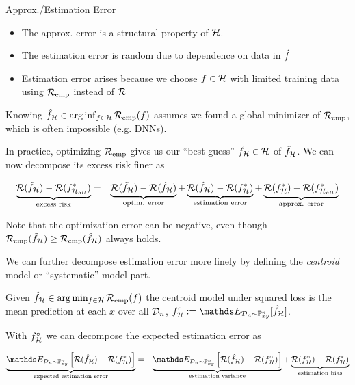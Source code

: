 \documentclass[11pt,compress,t,notes=noshow, xcolor=table]{beamer}
\begin{document}
\begin{vbframe}{Approx./Estimation Error }
    
\begin{itemize}
    \item The approx. error is a structural property of $\mathcal{H}$.
    \item The estimation error is random due to dependence on data in $\hat{f}$
    \item Estimation error arises because we choose $f \in \mathcal{H}$ with limited training data using $\mathcal{R}_{\text{emp}}$ instead of $\mathcal{R}$
\end{itemize}

Knowing $\hat{f}_{\mathcal{H}} \in \arg\inf_{f \in \mathcal{H}} \mathcal{R}_{\text{emp}}(f)$ assumes we found a global minimizer of $\mathcal{R}_{\text{emp}}$, which is often impossible (e.g. DNNs). 
\vspace{0.2cm}

In practice, optimizing $\mathcal{R}_{\text{emp}}$ gives us our ``best guess'' $\tilde{f}_{\mathcal{H}} \in \mathcal{H}$ of $\hat{f}_{\mathcal{H}}$. We can now decompose its excess risk finer as

\begin{eqnarray*}
    \underbrace{\mathcal{R}(\tilde{f}_{\mathcal{H}}) - \mathcal{R}(f^{\ast}_{\mathcal{H}_{all}})}_{\text{excess risk}} &=& \underbrace{\mathcal{R}(\tilde{f}_{\mathcal{H}}) - \mathcal{R}(\hat{f}_{\mathcal{H}})}_{\text{optim. error}} + \underbrace{\mathcal{R}(\hat{f}_{\mathcal{H}}) - \mathcal{R}(f^{\ast}_{\mathcal{H}})}_{\text{estimation error}} + \underbrace{\mathcal{R}(f^{\ast}_{\mathcal{H}}) -  \mathcal{R}(f^{\ast}_{\mathcal{H}_{all}})}_{\text{approx. error}} 
\end{eqnarray*}

Note that the optimization error can be negative, even though $\mathcal{R}_{\text{emp}}(\tilde{f}_{\mathcal{H}}) \geq \mathcal{R}_{\text{emp}}(\hat{f}_{\mathcal{H}})$ always holds.

\framebreak

We can further decompose estimation error more finely by defining the \textit{centroid} model or ``systematic'' model part.\\
\vspace{0.15cm}

Given $\hat{f}_{\mathcal{H}} \in  \arg\min_{f \in \mathcal{H}} \mathcal{R}_{\text{emp}}(f)$ the centroid model under squared loss is the mean prediction at each $x$ over all $\mathcal{D}_n$, $f^{\circ}_{\Hspace} := \E_{\D_n \sim \Pxy^n}[\fh_{\Hspace}] $.
\vspace{0.15cm}

With $f^{\circ}_{\mathcal{H}}$ we can decompose the expected estimation error as

\begin{eqnarray*}
 \underbrace{\E_{\D_n \sim \Pxy^n}\left[\risk(\hat{f}_{\Hspace}) - \risk(f ^{\ast}_{\Hspace})\right]}_{\text{expected estimation error}} &=& \underbrace{\E_{\D_n \sim \Pxy^n}\left[\risk(\hat{f}_{\Hspace}) - \risk(f^{\circ}_{\Hspace}) \right]}_{\text{estimation variance}} + \underbrace{\risk(f^{\circ}_{\Hspace})-\risk(f^{\ast}_{\Hspace})}_{\text{estimation bias}}   
\end{eqnarray*}


\end{vbframe}
\end{document}
